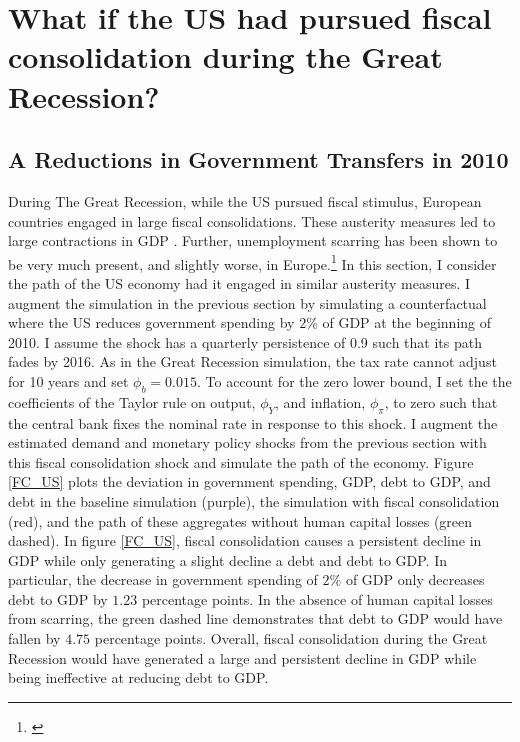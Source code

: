 \section{What if the US had pursued fiscal consolidation during the Great Recession?}


\subsection{A Reductions in Government Transfers in 2010}

During The Great Recession, while the US pursued fiscal stimulus, European countries engaged in large fiscal consolidations. These austerity measures led to large contractions in GDP \citep{Jorda2016,FATAS2018,House2020}. Further, unemployment scarring has been shown to be very much present, and slightly worse, in Europe.\footnote{\cite{Bertheau2023} } In this section, I consider the path of the US economy had it engaged in similar austerity measures. I augment the simulation in the previous section by simulating a counterfactual where the US reduces government spending by $2\%$ of GDP at the beginning of 2010. I assume the shock has a quarterly persistence of 0.9 such that its path fades by 2016. As in the Great Recession simulation, the tax rate cannot adjust for 10 years and set $\phi_{b}=0.015$. To account for the zero lower bound, I set the the coefficients of the Taylor rule on output, $\phi_{Y}$, and inflation, $\phi_{\pi}$, to zero such that the central bank fixes the nominal rate in response to this shock. I augment the estimated demand and monetary policy shocks from the previous section with this fiscal consolidation shock and simulate the path of the economy. Figure \ref{FC_US} plots the deviation in government spending, GDP, debt to GDP, and debt in the baseline simulation (purple), the simulation with fiscal consolidation (red), and the path of these aggregates without human capital losses (green dashed). In figure \ref{FC_US}, fiscal consolidation causes a persistent decline in GDP while only generating a slight decline a debt and debt to GDP. In particular, the decrease in government spending of  $2\%$ of GDP only decreases debt to GDP by $1.23$ percentage points. In the absence of human capital losses from scarring, the green dashed line demonstrates that debt to GDP would have fallen by $4.75$ percentage points. Overall, fiscal consolidation during the Great Recession would have generated a large and persistent decline in GDP while being ineffective at reducing debt to GDP.


